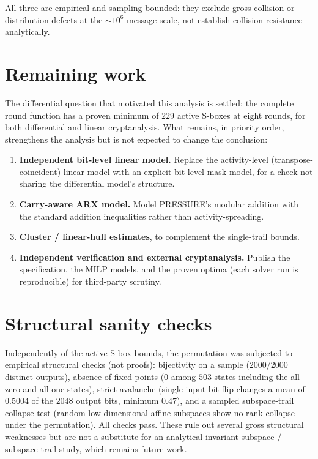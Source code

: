 \documentclass[11pt,a4paper]{article}
\begin{document}
All three are empirical and sampling-bounded: they exclude gross collision or
distribution defects at the $\sim\!10^{6}$-message scale, not establish collision
resistance analytically.

\section{Remaining work}

The differential question that motivated this analysis is settled: the complete
round function has a proven minimum of $229$ active S-boxes at eight rounds, for
both differential and linear cryptanalysis. What remains, in priority order,
strengthens the analysis but is not expected to change the conclusion:

\begin{enumerate}\itemsep2pt
  \item \textbf{Independent bit-level linear model.} Replace the activity-level
        (transpose-coincident) linear model with an explicit bit-level mask
        model, for a check not sharing the differential model's structure.
  \item \textbf{Carry-aware ARX model.} Model PRESSURE's modular addition with
        the standard addition inequalities rather than activity-spreading.
  \item \textbf{Cluster / linear-hull estimates}, to complement the single-trail
        bounds.
  \item \textbf{Independent verification and external cryptanalysis.} Publish the
        specification, the MILP models, and the proven optima (each solver run is
        reproducible) for third-party scrutiny.
\end{enumerate}

\section*{Structural sanity checks}

Independently of the active-S-box bounds, the permutation was subjected to
empirical structural checks (not proofs): bijectivity on a sample
($2000/2000$ distinct outputs), absence of fixed points ($0$ among $503$ states
including the all-zero and all-one states), strict avalanche (single input-bit
flip changes a mean of $0.5004$ of the $2048$ output bits, minimum $0.47$), and a
sampled subspace-trail collapse test (random low-dimensional affine subspaces
show no rank collapse under the permutation). All checks pass. These rule out
several gross structural weaknesses but are not a substitute for an analytical
invariant-subspace / subspace-trail study, which remains future work.
\end{document}
